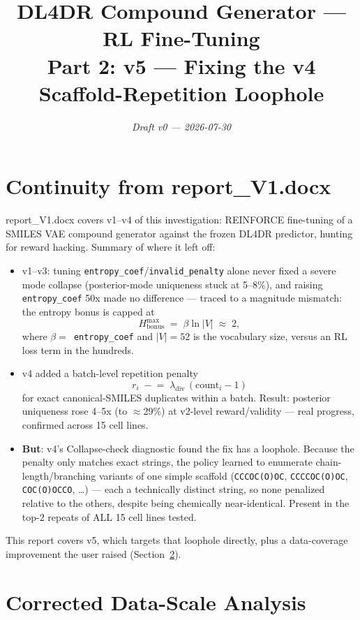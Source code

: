 \documentclass[11pt]{article}
\title{\textbf{DL4DR Compound Generator --- RL Fine-Tuning}\\[4pt]
\Large Part 2: v5 --- Fixing the v4 Scaffold-Repetition Loophole}
\author{}
\date{\itshape\color{notegray} Draft v0 --- 2026-07-30}
\newcommand{\code}[1]{\texttt{#1}}
\begin{document}
\maketitle
\vspace{-2em}

\section{Continuity from report\_V1.docx}

report\_V1.docx covers v1--v4 of this investigation: REINFORCE fine-tuning of a SMILES VAE compound generator against the frozen DL4DR predictor, hunting for reward hacking. Summary of where it left off:

\begin{itemize}
  \item v1--v3: tuning \code{entropy\_coef}/\code{invalid\_penalty} alone never fixed a severe mode collapse (posterior-mode uniqueness stuck at 5--8\%), and raising \code{entropy\_coef} 50x made no difference --- traced to a magnitude mismatch: the entropy bonus is capped at
  \[
    H_{\text{bonus}}^{\max} \;=\; \beta \ln|V| \;\approx\; 2,
  \]
  where $\beta=$~\code{entropy\_coef} and $|V|=52$ is the vocabulary size, versus an RL loss term in the hundreds.
  \item v4 added a batch-level repetition penalty
  \[
    r_i \;\mathrel{-}=\; \lambda_{\text{div}}\,(\text{count}_i - 1)
  \]
  for exact canonical-SMILES duplicates within a batch. Result: posterior uniqueness rose 4--5x (to $\approx$29\%) at v2-level reward/validity --- real progress, confirmed across 15 cell lines.
  \item \textbf{But}: v4's Collapse-check diagnostic found the fix has a loophole. Because the penalty only matches exact strings, the policy learned to enumerate chain-length/branching variants of one simple scaffold (\code{CCCOC(O)OC}, \code{CCCCOC(O)OC}, \code{COC(O)OCCO}, \ldots) --- each a technically distinct string, so none penalized relative to the others, despite being chemically near-identical. Present in the top-2 repeats of ALL 15 cell lines tested.
\end{itemize}

This report covers v5, which targets that loophole directly, plus a data-coverage improvement the user raised (Section~\ref{sec:datascale}).

\section{Corrected Data-Scale Analysis}
\label{sec:datascale}
\end{document}
